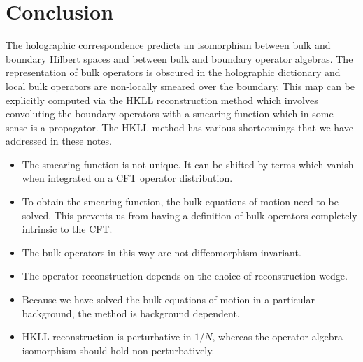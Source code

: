 \documentclass{PoS}
\begin{document}
\section{Conclusion}\label{sec:conclusion}
The holographic correspondence predicts an isomorphism between bulk and boundary Hilbert spaces and between bulk and boundary operator algebras. The representation of bulk operators is obscured in the holographic dictionary and local bulk operators are non-locally smeared over the boundary. This map can be explicitly computed via the HKLL reconstruction method which involves convoluting the boundary operators with a smearing function which in some sense is a propagator. The HKLL method has various shortcomings that we have addressed in these notes.
\begin{itemize}
\item The smearing function is not unique. It can be shifted by terms which vanish when integrated on a CFT operator distribution. 
\item To obtain the smearing function, the bulk equations of motion need to be solved. This prevents us from having a definition of bulk operators completely intrinsic to the CFT. 
\item The bulk operators in this way are not diffeomorphism invariant.
\item The operator reconstruction depends on the choice of reconstruction wedge.
\item Because we have solved the bulk equations of motion in a particular background, the  method is background dependent.
\item HKLL reconstruction is perturbative in $1/N$, whereas the operator algebra isomorphism should hold non-perturbatively.
\end{itemize}
\end{document}
